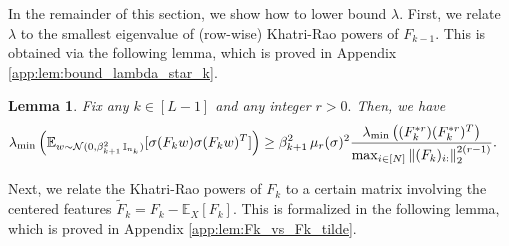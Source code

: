 \documentclass[11pt]{article}
\newcommand{\revision}[1]{#1}
\newcommand{\E}{\mathbb{E}}
\newcommand{\distas}[1]{\mathbin{\overset{#1}{\sim}}}
\newtheorem{lemma}[theorem]{Lemma}
\newcommand{\Id}{\mathbb{I}}
\newcommand{\littleO}[1]{o\left(#1\right)}
\newcommand{\bigO}[1]{\mathcal{O}\left(#1\right)}
\newcommand{\bigOmg}[1]{\Omega\left(#1\right)}
\newcommand{\bigexp}[1]{\exp\left(#1\right)}
\newcommand{\norm}[1]{\left\|#1\right\|}
\newcommand{\evmax}[1]{\lambda_{\rm max}\left(#1\right)}
\newcommand{\evmin}[1]{\lambda_{\rm min}\left(#1\right)}
\def\min{\mathop{\rm min}\nolimits}
\def\max{\mathop{\rm max}\nolimits}
\begin{document}
In the remainder of this section, we show how to lower bound $\lambda$.
First, we relate $\lambda$ to the smallest eigenvalue of (row-wise) Khatri-Rao powers of $F_{k-1}$. This is obtained via the following lemma, which is proved in Appendix \ref{app:lem:bound_lambda_star_k}.
\begin{lemma}\label{lem:bound_lambda_star_k}
    Fix any $k\in[L-1]$ and any integer $r>0.$ 
    Then, we have
    \begin{align*}
	&\evmin{ \E_{w\distas{}\mathcal{N}(0, \beta_{k+1}^2\, \Id_{n_k})} [\sigma(F_{k}w)\sigma(F_{k}w)^T] } \geq\beta_{k+1}^2\, \mu_r(\sigma)^2 \frac{\evmin{(F_{k}^{*r})(F_{k}^{*r})^T}}{\max_{i\in [N]}\norm{(F_{k})_{i:}}_2^{2(r-1)}} .
    \end{align*}
\end{lemma}
\revision{Next, we relate the Khatri-Rao powers of $F_k$ to a certain matrix involving the centered features $\tilde{F}_k=F_k-\E_X[F_k].$} This is formalized in the following lemma, which is proved in Appendix \ref{app:lem:Fk_vs_Fk_tilde}.
\end{document}
